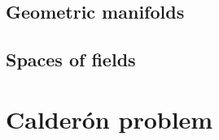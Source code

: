 \documentclass[12pt]{report}
\begin{document}
\section{Geometric manifolds}
\label{sec:geometric_manifolds}


\section{Spaces of fields}
\label{sec:spaces_of_fields}


\newpage



\chapter{Calder\'on problem}



%
%
%

%
%
%
%

%




\end{document}
